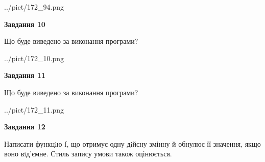 \documentclass[12pt, ukrainian]{article}
\begin{document}
{\begin {large}
\begin{center}
	{../pict/172_94.png}
\end{center}
\newpage

{\begin {center}\textbf{Завдання 10}\end {center}}

Що буде виведено за виконання програми?\par
\begin{center}
	{../pict/172_10.png}
\end{center}
\newpage

{\begin {center}\textbf{Завдання 11}\end {center}}

Що буде виведено за виконання програми?\par
\begin{center}
	{../pict/172_11.png}
\end{center}
\newpage

{\begin {center}\textbf{Завдання 12}\end {center}}


Написати функцiю f, що отримує одну дiйсну змінну й обнулює її значення, якщо воно вiд'ємне. Стиль запису умови також оцінюється.\par
\newpage

\end {large}}
\end{document}
